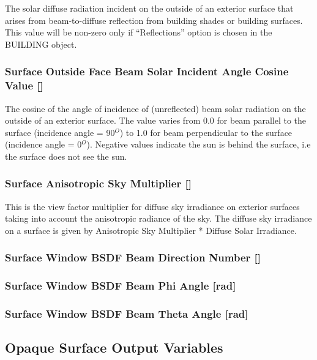 The solar diffuse radiation incident on the outside of an exterior surface that arises from beam-to-diffuse reflection from building shades or building surfaces. This value will be non-zero only if ``Reflections'' option is chosen in the BUILDING object.

\subsubsection{Surface Outside Face Beam Solar Incident Angle Cosine Value {[]}}\label{surface-outside-face-beam-solar-incident-angle-cosine-value}

The cosine of the angle of incidence of (unreflected) beam solar radiation on the outside of an exterior surface. The value varies from 0.0 for beam parallel to the surface (incidence angle = 90\(^{O}\)) to 1.0 for beam perpendicular to the surface (incidence angle = 0\(^{O}\)). Negative values indicate the sun is behind the surface, i.e the surface does not see the sun.

\subsubsection{Surface Anisotropic Sky Multiplier {[]}}\label{surface-anisotropic-sky-multiplier}

This is the view factor multiplier for diffuse sky irradiance on exterior surfaces taking into account the anisotropic radiance of the sky. The diffuse sky irradiance on a surface is given by Anisotropic Sky Multiplier * Diffuse Solar Irradiance.

\subsubsection{Surface Window BSDF Beam Direction Number {[]}}\label{surface-window-bsdf-beam-direction-number}

\subsubsection{Surface Window BSDF Beam Phi Angle {[}rad{]}}\label{surface-window-bsdf-beam-phi-angle-rad}

\subsubsection{Surface Window BSDF Beam Theta Angle {[}rad{]}}\label{surface-window-bsdf-beam-theta-angle-rad}

\subsection{Opaque Surface Output Variables}\label{opaque-surface-output-variables}

